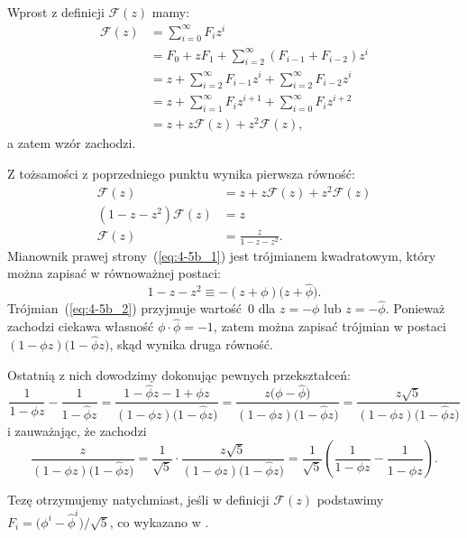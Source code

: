 
\subproblem %
Wprost z definicji $\mathcal{F}(z)$ mamy:
\begin{align*}
	\mathcal{F}(z) &= \sum_{i=0}^\infty F_iz^i \\
	&= F_0+zF_1+\sum_{i=2}^\infty (F_{i-1}+F_{i-2})z^i \\
	&= z+\sum_{i=2}^\infty F_{i-1}z^i+\sum_{i=2}^\infty F_{i-2}z^i \\
	&= z+\sum_{i=1}^\infty F_iz^{i+1}+\sum_{i=0}^\infty F_iz^{i+2} \\[2mm]
	&= z+z\mathcal{F}(z)+z^2\mathcal{F}(z),
\end{align*}
a zatem wzór zachodzi.

\subproblem %
Z tożsamości z poprzedniego punktu wynika pierwsza równość:
\begin{align}
	\mathcal{F}(z) &= z+z\mathcal{F}(z)+z^2\mathcal{F}(z) \nonumber \\
	(1-z-z^2)\mathcal{F}(z) &= z \nonumber \\
	\mathcal{F}(z) &= \frac{z}{1-z-z^2}. \label{eq:4-5b_1}
\end{align}
Mianownik prawej strony~(\ref{eq:4-5b_1}) jest trójmianem kwadratowym, który można zapisać w równoważnej postaci:
\begin{equation}
	1-z-z^2 \equiv -(z+\phi)\bigl(z+\widehat\phi\bigr). \label{eq:4-5b_2}
\end{equation}
Trójmian~(\ref{eq:4-5b_2}) przyjmuje wartość~0 dla $z=-\phi$ lub $z=-\widehat\phi$. Ponieważ zachodzi ciekawa własność $\phi\cdot\widehat\phi=-1$, zatem można zapisać trójmian w postaci $(1-\phi z)\bigl(1-\widehat\phi z\bigr)$, skąd wynika druga równość.

Ostatnią z nich dowodzimy dokonując pewnych przekształceń:
\[
	\frac{1}{1-\phi z}-\frac{1}{1-\widehat\phi z} = \frac{1-\widehat\phi z-1+\phi z}{(1-\phi z)\bigl(1-\widehat\phi z\bigr)} = \frac{z\bigl(\phi-\widehat\phi\bigr)}{(1-\phi z)\bigl(1-\widehat\phi z\bigr)} = \frac{z\sqrt{5}}{(1-\phi z)\bigl(1-\widehat\phi z\bigr)}
\]
i zauważając, że zachodzi
\[
	\frac{z}{(1-\phi z)\bigl(1-\widehat\phi z\bigr)} = \frac{1}{\sqrt{5}}\cdot\frac{z\sqrt{5}}{(1-\phi z)\bigl(1-\widehat\phi z\bigr)} = \frac{1}{\sqrt{5}}\left(\frac{1}{1-\phi z}-\frac{1}{1-\widehat\phi z}\right).
\]

\subproblem %
Tezę otrzymujemy natychmiast, jeśli w definicji $\mathcal{F}(z)$ podstawimy $F_i=\bigl(\phi^i-\widehat\phi^i\bigr)/\sqrt{5}$, co wykazano w .

